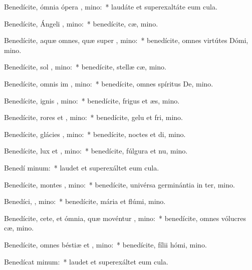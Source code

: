 \item Benedícite, ómnia ópera , mino:~* laudáte et superexaltáte eum  cula.
\item Benedícite, Ángeli , mino:~* benedícite, cæ, mino.
\item Benedícite, aquæ omnes, quæ super  , mino:~* benedícite, omnes virtútes Dómi, mino.
\item Benedícite, sol  , mino:~* benedícite, stellæ cæ, mino.
\item Benedícite, omnis im  , mino:~* benedícite, omnes spíritus De, mino.
\item Benedícite, ignis  , mino:~* benedícite, frigus et æs, mino.
\item Benedícite, rores et , mino:~* benedícite, gelu et fri, mino.
\item Benedícite, glácies  , mino:~* benedícite, noctes et di, mino.
\item Benedícite, lux et , mino:~* benedícite, fúlgura et nu, mino.
\item Benedí  minum:~* laudet et superexáltet eum  cula.
\item Benedícite, montes  , mino:~* benedícite, univérsa germinántia in ter, mino.
\item Benedíci, , mino:~* benedícite, mária et flúmi, mino.
\item Benedícite, cete, et ómnia, quæ movéntur  , mino:~* benedícite, omnes vólucres cæ, mino.
\item Benedícite, omnes béstiæ et , mino:~* benedícite, fílii hómi, mino.
\item Benedícat  minum:~* laudet et superexáltet eum  cula.
